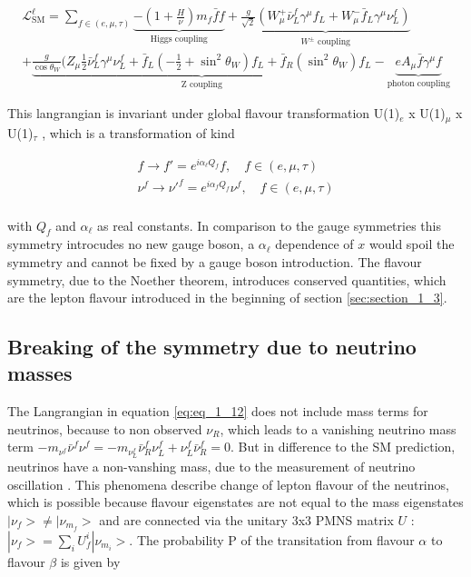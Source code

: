 \begin{multline}
	\label{eq:eq_1_12}
	\mathcal{L}^{\ell}_{\text{SM}} = \sum_{f \in (e, \mu, \tau)} \underbrace{-(1+\frac{H}{\nu}) m_{f} \bar{f}f}_\text{Higgs coupling} + \underbrace{\frac{g}{\sqrt{2}} (W^{+}_{\mu} \bar{\nu}^{f}_{L} \gamma^{\mu} f_{L} + W^{-}_{\mu} \bar{f}_{L} \gamma^{\mu} \nu^{f}_{L})}_{W^{\pm} \text{ coupling}} \\
	+ \underbrace{\frac{g}{\cos{\theta_{W}}}(Z_{\mu} \frac{1}{2} \bar{\nu}^{f}_{L} \gamma^{\mu}\nu^{f}_{L} + \bar{f}_{L}(-\frac{1}{2} + \sin^2{\theta_{W}})f_{L} + \bar{f}_{R}(\sin^2{\theta_{W}})f_{L}}_{\text{Z coupling}} - \underbrace{eA_{\mu}\bar{f}\gamma^{\mu}f}_{\text{photon coupling}}
\end{multline}

This langrangian is invariant under global flavour transformation U(1)$_{e}$ x U(1)$_{\mu}$ x U(1)$_{\tau}$ \cite{LFV1, LFV2}, which is a transformation of kind 

\begin{equation}
	\label{eq:eq_1_13}
	\begin{split}
		f \rightarrow f' = e^{i\alpha_{\ell}Q_{f}}f, \quad f \in (e, \mu, \tau) \\
		\nu^{f} \rightarrow \nu'^{f} = e^{i\alpha_{f}Q_{f}}\nu^{f}, \quad f \in (e, \mu, \tau) \\
	\end{split}
\end{equation}

with $Q_{f}$ and $\alpha_{\ell}$ as real constants. In comparison to the gauge symmetries this symmetry introcudes no new gauge boson, a $\alpha_{\ell}$ dependence of $x$ would spoil the symmetry and cannot be fixed by a gauge boson introduction. The flavour symmetry, due to the Noether theorem, introduces conserved quantities, which are the lepton flavour introduced in the beginning of section \ref{sec:section_1_3}.


\subsection{Breaking of the symmetry due to neutrino masses}
\label{sec:section_1_3_2}

The Langrangian in equation \ref{eq:eq_1_12} does not include mass terms for neutrinos, because to non observed $\nu_R$, which leads to a vanishing neutrino mass term $-m_{\nu^{f}}\bar{\nu}^{f}\nu^{f} = -m_{\nu^{f}_{L}}\bar{\nu}^{f}_{R}\nu^{f}_{L} + {\nu}^{f}_{L}\bar{\nu}^{f}_{R} = 0$. But in difference to the \gls{SM} prediction, neutrinos have a non-vanshing mass, due to the measurement of neutrino oscillation \cite{NEUTRINOOSC}. This phenomena describe change of lepton flavour of the neutrinos, which is possible because flavour eigenstates are not equal to the mass eigenstates $|\nu_{f}> \neq |\nu_{m_{f}}>$ and are connected via the unitary 3x3 PMNS matrix $U$ \cite{PMNS}: $|\nu_{f}> =  \sum_{i} U^{i}_{f}|\nu_{m_{i}}>$. The probability P of the transitation from flavour $\alpha$ to flavour $\beta$ \cite{NEUTRINOPROB} is given by 

